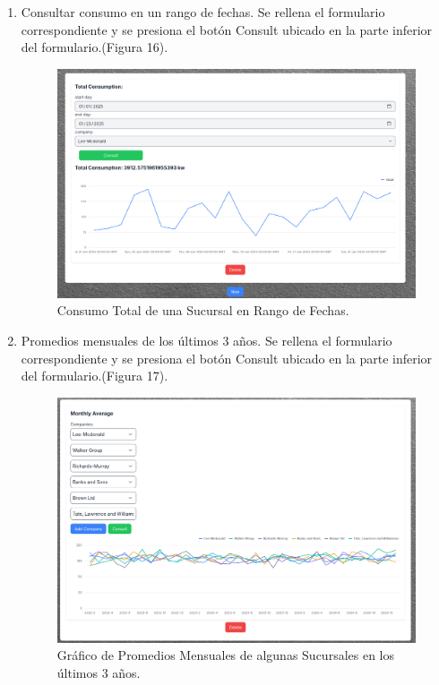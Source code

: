 \documentclass{article}
\begin{document}
\begin{enumerate}
    \item Consultar consumo en un rango de fechas. Se rellena el formulario correspondiente y se presiona el botón Consult ubicado en la parte inferior del formulario.(Figura 16).
    \begin{figure}[h!]
        \centering
        \includegraphics[width= 14cm]{total_consumption.png}
        \caption{Consumo Total de una Sucursal en Rango de Fechas.}
    \end{figure}
    \item Promedios mensuales de los últimos 3 años. Se rellena el formulario correspondiente y se presiona el botón Consult ubicado en la parte inferior del formulario.(Figura 17).
    \begin{figure}[h!]
        \centering
        \includegraphics[width= 14cm]{monthly_average.png}
        \caption{Gráfico de Promedios Mensuales de algunas Sucursales en los últimos 3 años.}

\end{figure}
\end{enumerate}
\end{document}
